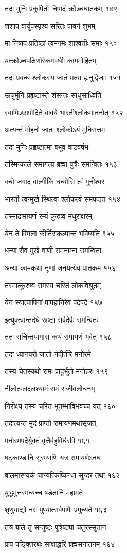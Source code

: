तदा मुनिः प्रकुपितो निषादं क्रौञ्चघातकम् १४९

शशाप वार्युपस्पृश्य सरितः पावनं शुभम्

मा निषाद प्रतिष्ठां त्वमगमः शाश्वतीः समाः १५०

यत्क्रौञ्चपक्षिणोरेकमवधीः काममोहितम्

तदा प्रबन्धं श्लोकस्य जातं मत्वा ह्यनुद्विजाः १५१

ऊचुर्मुनिं प्रहृष्टास्ते शंसन्तः साधुसाध्विति

स्वामिञ्छापोदिते वाक्ये भारतीश्लोकमातनोत् १५२

अत्यन्तं मोहनो जातः श्लोकोऽयं मुनिसत्तम

तदा मुनिः प्रहृष्टात्मा बभूव वाडवर्षभ

तस्मिन्काले समागत्य ब्रह्मा पुत्रैः समन्वितः १५३

वचो जगाद वाल्मीकिं धन्योसि त्वं मुनीश्वर

भारती त्वन्मुखे स्थित्वा श्लोकत्वं समपद्यत १५४

तस्माद्रामायणं रम्यं कुरुष्व मधुराक्षरम्

येन ते विमला कीर्तिराकल्पान्तं भविष्यति १५५

धन्या सैव मुखे वाणी रामनाम्ना समन्विता

अन्या कामकथा नॄणां जनयत्येव पातकम् १५६

तस्मात्कुरुष्व रामस्य चरितं लोकविश्रुतम्

येन स्यात्पापिनां पापहानिरेव पदेपदे १५७

इत्युक्त्वान्तर्दधे स्रष्टा सर्वदेवैः समन्वितः

ततः सचिन्तयामास कथं रामायणं भवेत् १५८

तदा ध्यानपरो जातो नदीतीरे मनोरमे

तस्य चेतस्यथो रामः प्रादुर्भूतो मनोहरः १५९

नीलोत्पलदलश्यामं रामं राजीवलोचनम्

निरीक्ष्य तस्य चरितं भूतम्भाविभवच्च यत् १६०

तदात्यन्तं मुदं प्राप्तो रामायणमथासृजत्

मनोरमपदैर्युक्तं वृत्तैर्बहुविधैरपि १६१

षट्काण्डानि सुरम्याणि यत्र रामायणेऽनघ

बालमारण्यकं चान्यत्किष्किन्धा सुन्दरं तथा १६२

युद्धमुत्तरमन्यच्च षडेतानि महामते

शृणुयाद्यो नरः पुण्यात्सर्वपापैः प्रमुच्यते १६३

तत्र बाले तु सन्तुष्टः पुत्रेष्ट्या चतुरस्सुतान्

प्राप पङ्क्तिरथः साक्षाद्धरिं ब्रह्मसनातनम् १६४

